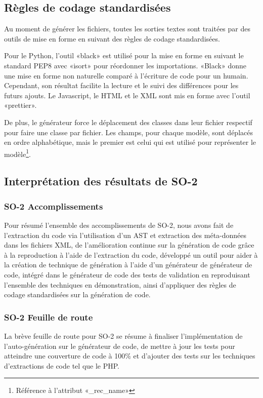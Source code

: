 \subsection {Règles de codage standardisées}

Au moment de générer les fichiers, toutes les sorties textes sont traitées par des outils de mise en forme en suivant des règles de codage standardisées.

Pour le Python, l’outil «black» est utilisé pour la mise en forme en suivant le standard PEP8 avec «isort» pour réordonner les importations. «Black» donne une mise en forme non naturelle comparé à l’écriture de code pour un humain. Cependant, son résultat facilite la lecture et le suivi des différences pour les futurs ajouts. Le Javascript, le HTML et le XML sont mis en forme avec l’outil «prettier».

De plus, le générateur force le déplacement des classes dans leur fichier respectif pour faire une classe par fichier. Les champs, pour chaque modèle, sont déplacés en ordre alphabétique, mais le premier est celui qui est utilisé pour représenter le modèle\footnote{Référence à l'attribut «\_rec\_name»}.

\subsection{Interprétation des résultats de SO-2}

\subsubsection{SO-2 Accomplissements}
Pour résumé l'ensemble des accomplissements de SO-2, nous avons fait de l'extraction du code via l’utilisation d’un AST et extraction des méta-données dans les fichiers XML, de l'amélioration continue sur la génération de code grâce à la reproduction à l’aide de l’extraction du code, développé un outil pour aider à la création de technique de génération à l’aide d’un générateur de générateur de code, intégré dans le générateur de code des tests de validation en reproduisant l’ensemble des techniques en démonstration, ainsi d'appliquer des règles de codage standardisées sur la génération de code.

\subsubsection{SO-2 Feuille de route}
La brève feuille de route pour SO-2 se résume à finaliser l’implémentation de l'auto-génération sur le générateur de code, de mettre à jour les tests pour atteindre une couverture de code à 100\% et d'ajouter des tests sur les techniques d’extractions de code tel que le PHP.

